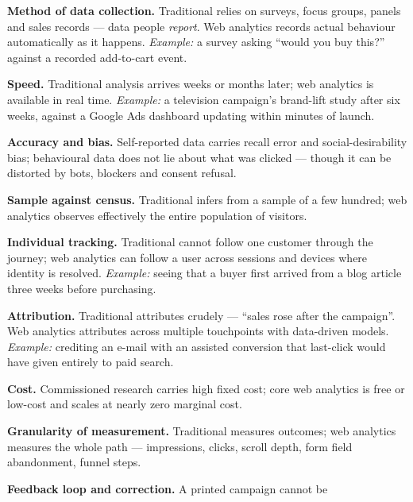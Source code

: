 \begin{qlist}
\begin{apts}
\item \textbf{Method of data collection.} Traditional relies on surveys, focus
      groups, panels and sales records --- data people \emph{report}. Web
      analytics records actual behaviour automatically as it happens.
      \emph{Example:} a survey asking ``would you buy this?'' against a
      recorded add-to-cart event.
\item \textbf{Speed.} Traditional analysis arrives weeks or months later; web
      analytics is available in real time. \emph{Example:} a television
      campaign's brand-lift study after six weeks, against a Google Ads
      dashboard updating within minutes of launch.
\item \textbf{Accuracy and bias.} Self-reported data carries recall error and
      social-desirability bias; behavioural data does not lie about what was
      clicked --- though it can be distorted by bots, blockers and consent
      refusal.
\item \textbf{Sample against census.} Traditional infers from a sample of a few
      hundred; web analytics observes effectively the entire population of
      visitors.
\item \textbf{Individual tracking.} Traditional cannot follow one customer
      through the journey; web analytics can follow a user across sessions and
      devices where identity is resolved. \emph{Example:} seeing that a buyer
      first arrived from a blog article three weeks before purchasing.
\item \textbf{Attribution.} Traditional attributes crudely --- ``sales rose after
      the campaign''. Web analytics attributes across multiple touchpoints with
      data-driven models. \emph{Example:} crediting an e-mail with an assisted
      conversion that last-click would have given entirely to paid search.
\item \textbf{Cost.} Commissioned research carries high fixed cost; core web
      analytics is free or low-cost and scales at nearly zero marginal cost.
\item \textbf{Granularity of measurement.} Traditional measures outcomes; web
      analytics measures the whole path --- impressions, clicks, scroll depth,
      form field abandonment, funnel steps.
\item \textbf{Feedback loop and correction.} A printed campaign cannot be

\end{apts}
\end{qlist}
